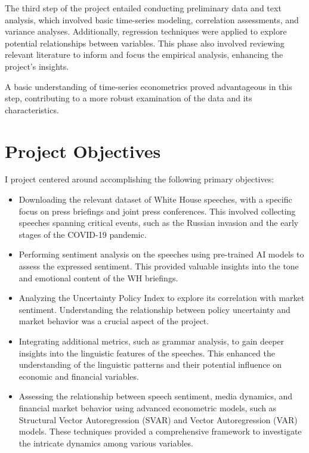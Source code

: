 \documentclass{article}
\begin{document}
The third step of the project entailed conducting preliminary data and text analysis, which involved basic time-series modeling, correlation assessments, and variance analyses. Additionally, regression techniques were applied to explore potential relationships between variables. This phase also involved reviewing relevant literature to inform and focus the empirical analysis, enhancing the project's insights.
\par
A basic understanding of time-series econometrics proved advantageous in this step, contributing to a more robust examination of the data and its characteristics.

\section{Project Objectives}

I project centered around accomplishing the following primary objectives:

\begin{itemize}
\item Downloading the relevant dataset of White House speeches, with a specific focus on press briefings and joint press conferences. This involved collecting speeches spanning critical events, such as the Russian invasion and the early stages of the COVID-19 pandemic.
\item Performing sentiment analysis on the speeches using pre-trained AI models to assess the expressed sentiment. This provided valuable insights into the tone and emotional content of the WH briefings.
\item Analyzing the Uncertainty Policy Index to explore its correlation with market sentiment. Understanding the relationship between policy uncertainty and market behavior was a crucial aspect of the project.
\item Integrating additional metrics, such as grammar analysis, to gain deeper insights into the linguistic features of the speeches. This enhanced the understanding of the linguistic patterns and their potential influence on economic and financial variables.
\item Assessing the relationship between speech sentiment, media dynamics, and financial market behavior using advanced econometric models, such as Structural Vector Autoregression (SVAR) and Vector Autoregression (VAR) models. These techniques provided a comprehensive framework to investigate the intricate dynamics among various variables.
\end{itemize}
\end{document}
